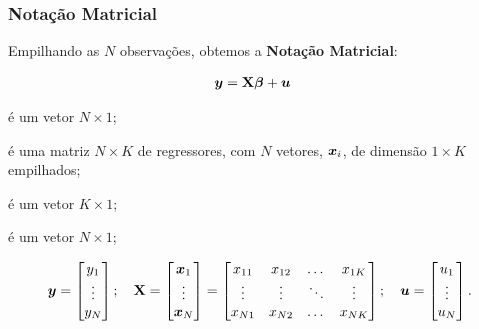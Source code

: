 \documentclass[11pt, oneside, a4paper, article]{article}
\numberwithin{equation}{section}
\begin{document}
\subsubsection{Notação Matricial}
Empilhando as $N$ observações, obtemos a \textbf{Notação Matricial}:

\vspace{-1 em}
\begin{align} \label{ols:mod:mat}
	\boldsymbol{y} &= \mathbf{X} \boldsymbol{\beta} + \boldsymbol{u} 
\end{align}

\begin{description}[noitemsep]
	\item [$\yvec$]  é um vetor $N \times 1$;

	\item [$\Xmat$]  é uma matriz $N \times K$ de regressores, com $N$ vetores, $\boldsymbol{x}_{i}$, de dimensão $1 \times K$ empilhados;

	\item [$\betavec$] é um vetor $K \times 1$;

	\item [$\uvec$] é um vetor $N \times 1$;
\end{description}

\vspace{-1 em}
\begin{align*}
	\boldsymbol{y} = 
	\begin{bmatrix}
		y_{1} \\ \vdots \\ y_{N}		
	\end{bmatrix};
	\quad
	\mathbf{X} = 
	\begin{bmatrix}
		\boldsymbol{x}_{1} \\ \vdots \\ \boldsymbol{x}_{N}
	\end{bmatrix} = 
	\begin{bmatrix}
		x_{11}     & x_{12}     & \dots  & x_{1K} \\          
		\vdots     & \vdots     & \ddots & \vdots \\        
		x_{N1} & x_{N2} & \dots  & x_{NK}		
	\end{bmatrix};
	\quad
	\boldsymbol{u} = 
	\begin{bmatrix}
		u_{1} \\ \vdots \\ u_{N}		
	\end{bmatrix}.
\end{align*}
\end{document}
